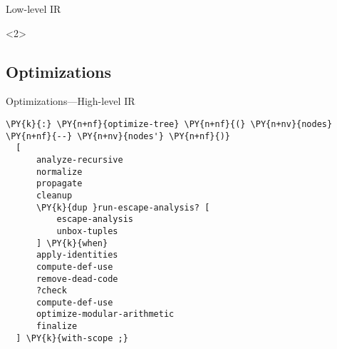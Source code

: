 \documentclass{beamer}
\begin{document}
\begin{frame}[fragile]{Low-level IR}
\begin{onlyenv}
\begin{center}
\begin{minipage}{0.4\linewidth}
    \end{minipage}
  \end{center}
  \end{onlyenv}
  \begin{onlyenv}<2>
  \begin{center}
  \end{center}
  \end{onlyenv}
\end{frame}

\subsection{Optimizations}

\begin{frame}[fragile]{Optimizations---High-level IR}
\footnotesize
\begin{center}
\begin{minipage}{0.5\linewidth}
\begin{Verbatim}[commandchars=\\\{\}]
\PY{k}{:} \PY{n+nf}{optimize-tree} \PY{n+nf}{(} \PY{n+nv}{nodes} \PY{n+nf}{--} \PY{n+nv}{nodes'} \PY{n+nf}{)}
  [
      analyze-recursive
      normalize
      propagate
      cleanup
      \PY{k}{dup }run-escape-analysis? [
          escape-analysis
          unbox-tuples
      ] \PY{k}{when}
      apply-identities
      compute-def-use
      remove-dead-code
      ?check
      compute-def-use
      optimize-modular-arithmetic
      finalize
  ] \PY{k}{with-scope ;}
\end{Verbatim}
\end{minipage}
\end{center}
\end{frame}
\end{document}
